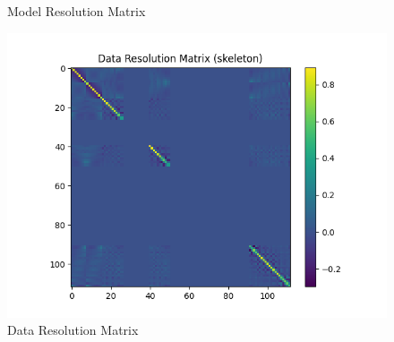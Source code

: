 \documentclass{article}
\begin{document}
\begin{itemize}
\begin{figure}[h]
    \caption{Model Resolution Matrix}
\end{figure}
\begin{figure}[h]
    \centering
    \includegraphics[width=1\textwidth]{images/outputs/datares/skeleton.png}
    \caption{Data Resolution Matrix}
\end{figure}
\clearpage



\end{itemize}
\end{document}
